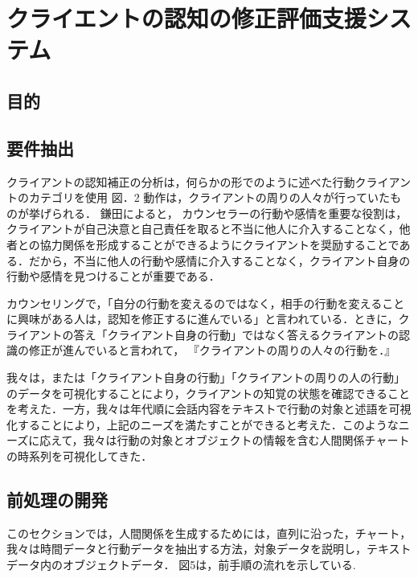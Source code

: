 \documentclass[shuuron]{kuee}
\begin{document}





\chapter{クライエントの認知の修正評価支援システム}
	\section{目的}


\section{要件抽出}

クライアントの認知補正の分析は，何らかの形でのように述べた行動クライアントのカテゴリを使用 図．2 動作は，クライアントの周りの人々が行っていたものが挙げられる． 鎌田によると\cite{kamata2002}， カウンセラーの行動や感情を重要な役割は，クライアントが自己決意と自己責任を取ると不当に他人に介入することなく，他者との協力関係を形成することができるようにクライアントを奨励することである．だから，不当に他人の行動や感情に介入することなく，クライアント自身の行動や感情を見つけることが重要である．

  カウンセリングで，「自分の行動を変えるのではなく，相手の行動を変えることに興味がある人は，認知を修正するに進んでいる」と言われている．ときに，クライアントの答え「クライアント自身の行動」ではなく答えるクライアントの認識の修正が進んでいると言われて， 『クライアントの周りの人々の行動を．』

  我々は，または「クライアント自身の行動」「クライアントの周りの人の行動」のデータを可視化することにより，クライアントの知覚の状態を確認できることを考えた．一方，我々は年代順に会話内容をテキストで行動の対象と述語を可視化することにより，上記のニーズを満たすことができると考えた．このようなニーズに応えて，我々は行動の対象とオブジェクトの情報を含む人間関係チャートの時系列を可視化してきた．



\section{前処理の開発}

  このセクションでは，人間関係を生成するためには，直列に沿った，チャート，我々は時間データと行動データを抽出する方法，対象データを説明し，テキストデータ内のオブジェクトデータ． 図5は，前手順の流れを示している.
\end{document}
